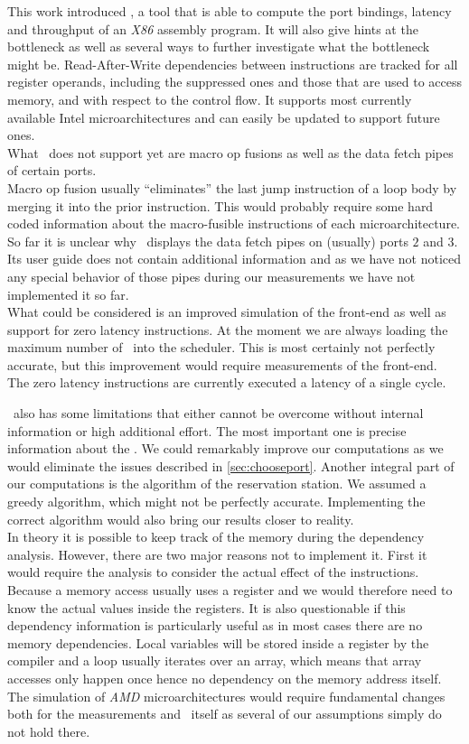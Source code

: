 This work introduced \suaca, a tool that is able to compute the port bindings, latency and throughput of an \emph{X86} assembly program. It will also give hints at the bottleneck as well as several ways to further investigate what the bottleneck might be. Read-After-Write dependencies between instructions are tracked for all register operands, including the suppressed ones and those that are used to access memory, and with respect to the control flow. It supports most currently available Intel microarchitectures and can easily be updated to support future ones.\\

What \suaca\ does not support yet are macro op fusions as well as the data fetch pipes of certain ports.\\
Macro op fusion usually ``eliminates'' the last jump instruction of a loop body by merging it into the prior instruction. This would probably require some hard coded information about the macro-fusible instructions of each microarchitecture.\\
So far it is unclear why \iaca\ displays the data fetch pipes on (usually) ports $2$ and $3$. Its user guide does not contain additional information and as we have not noticed any special behavior of those pipes during our measurements we have not implemented it so far.\\
What could be considered is an improved simulation of the front-end as well as support for zero latency instructions. At the moment we are always loading the maximum number of \microops\ into the scheduler. This is most certainly not perfectly accurate, but this improvement would require measurements of the front-end. The zero latency instructions are currently executed a latency of a single cycle.

\suaca\ also has some limitations that either cannot be overcome without internal information or high additional effort.
The most important one is precise information about the \microops. We could remarkably improve our computations as we would eliminate the issues described in \autoref{sec:chooseport}. Another integral part of our computations is the algorithm of the reservation station. We assumed a greedy algorithm, which might not be perfectly accurate. Implementing the correct algorithm would also bring our results closer to reality.\\
In theory it is possible to keep track of the memory during the dependency analysis. However, there are two major reasons not to implement it. First it would require the analysis to consider the actual effect of the instructions. Because a memory access usually uses a register and we would therefore need to know the actual values inside the registers. It is also questionable if this dependency information is particularly useful as in most cases there are no memory dependencies. Local variables will be stored inside a register by the compiler and a loop usually iterates over an array, which means that array accesses only happen once hence no dependency on the memory address itself.\\
The simulation of \emph{AMD} microarchitectures would require fundamental changes both for the measurements and \suaca\ itself as several of our assumptions simply do not hold there.
